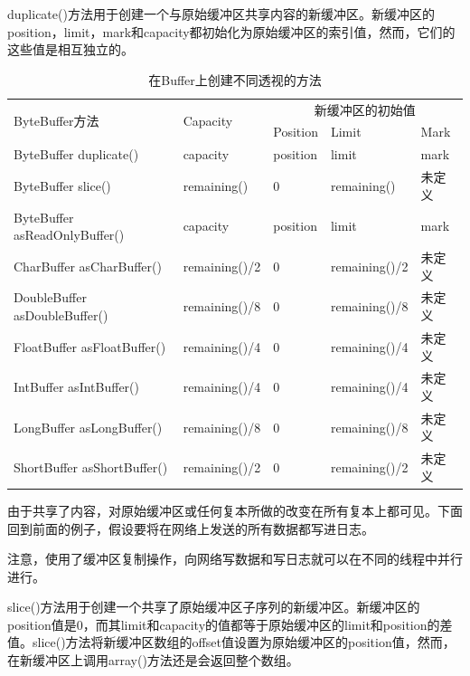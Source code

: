 		duplicate()方法用于创建一个与原始缓冲区共享内容的新缓冲区。新缓冲区的position，limit，mark和capacity都初始化为原始缓冲区的索引值，然而，它们的这些值是相互独立的。 

		\begin{table}[htbp]
			\caption{在Buffer上创建不同透视的方法}
			\label{tab:diff.view.on.buffer}
			\centering
			\begin{tabular}{lllll}
				\hline
					\multirow{2}{*}{ByteBuffer方法} & \multirow{2}{*}{Capacity}  & \multicolumn{3}{c}{新缓冲区的初始值}   \\
						        					&                                    & Position & Limit     & Mark  \\
				\hline
					ByteBuffer duplicate()        & capacity      & position & limit         & mark   \\
					ByteBuffer slice()            & remaining()   & 0        & remaining()   & 未定义 \\
					ByteBuffer asReadOnlyBuffer() & capacity      & position & limit         & mark   \\
					CharBuffer asCharBuffer()     & remaining()/2 & 0        & remaining()/2 & 未定义 \\
					DoubleBuffer asDoubleBuffer() & remaining()/8 & 0        & remaining()/8 & 未定义 \\
					FloatBuffer asFloatBuffer()   & remaining()/4 & 0        & remaining()/4 & 未定义 \\
					IntBuffer asIntBuffer()       & remaining()/4 & 0        & remaining()/4 & 未定义 \\
					LongBuffer asLongBuffer()     & remaining()/8 & 0        & remaining()/8 & 未定义 \\
					ShortBuffer asShortBuffer()   & remaining()/2 & 0        & remaining()/2 & 未定义 \\
				\hline
			\end{tabular}
		\end{table}

		由于共享了内容，对原始缓冲区或任何复本所做的改变在所有复本上都可见。下面回到前面的例子，假设要将在网络上发送的所有数据都写进日志。 

		

		注意，使用了缓冲区复制操作，向网络写数据和写日志就可以在不同的线程中并行进行。 

		slice()方法用于创建一个共享了原始缓冲区子序列的新缓冲区。新缓冲区的position值是0，而其limit和capacity的值都等于原始缓冲区的limit和position的差值。slice()方法将新缓冲区数组的offset值设置为原始缓冲区的position值，然而，在新缓冲区上调用array()方法还是会返回整个数组。 

